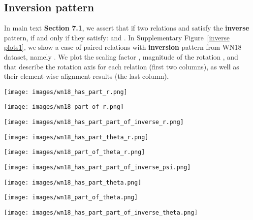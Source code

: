 \documentclass[11pt]{article}
\begin{document}
\subsection{Inversion pattern}
In main text \textbf{Section 7.1}, we assert that if two relations  and  satisfy the \textbf{inverse} pattern, if and only if they satisfy:  and . In Supplementary Figure~\ref{inverse plots1}, we show a case of paired relations with \textbf{inversion} pattern from WN18 dataset, namely . We plot the scaling factor , magnitude of the rotation , and  that describe the rotation axis for each relation (first two columns), as well as their element-wise alignment results (the last column).



\begin{figure*}[htbp]
\centering
\begin{minipage}{3.9cm}
\centering
\texttt{[image: images/wn18\_has\_part\_r.png]}
\subcaption{\tiny{}}
\end{minipage}
\begin{minipage}{3.9cm}
\centering
\texttt{[image: images/wn18\_part\_of\_r.png]}
\subcaption{\tiny{}}
\end{minipage}
\begin{minipage}{3.9cm}
\centering
\texttt{[image: images/wn18\_has\_part\_part\_of\_inverse\_r.png]}
\subcaption{\tiny{}}
\end{minipage}


\begin{minipage}{4cm}
\centering
\texttt{[image: images/wn18\_has\_part\_theta\_r.png]}
\subcaption{\tiny{}}
\end{minipage}\begin{minipage}{4cm}
\centering
\texttt{[image: images/wn18\_part\_of\_theta\_r.png]}
\subcaption{\tiny{}}
\end{minipage}
\begin{minipage}{4cm}
\centering
\texttt{[image: images/wn18\_has\_part\_part\_of\_inverse\_psi.png]}
\subcaption{\tiny{}}
\end{minipage}


\begin{minipage}{4cm}
\centering
\texttt{[image: images/wn18\_has\_part\_theta.png]}
\subcaption{\tiny{}}
\end{minipage}\begin{minipage}{4cm}
\centering
\texttt{[image: images/wn18\_part\_of\_theta.png]}
\subcaption{\tiny{}}
\end{minipage}
\begin{minipage}{4cm}
\centering
\texttt{[image: images/wn18\_has\_part\_part\_of\_inverse\_theta.png]}
\subcaption{\tiny{}}
\end{minipage}



\end{figure*}
\end{document}
